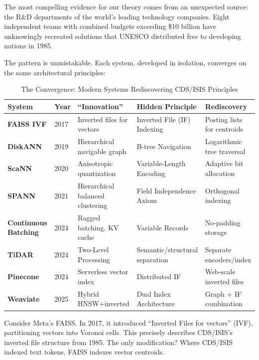\documentclass[manuscript,screen,nonacm]{acmart}
\begin{document}
The most compelling evidence for our theory comes from an unexpected source: the R\&D departments of the world's leading technology companies. Eight independent teams with combined budgets exceeding \$10 billion have unknowingly recreated solutions that UNESCO distributed free to developing nations in 1985.

The pattern is unmistakable. Each system, developed in isolation, converges on the same architectural principles:

\begin{table}[h]
\centering
\caption{The Convergence: Modern Systems Rediscovering CDS/ISIS Principles}
\label{tab:convergence}
\begin{tabular}{p{} p{} p{} p{} p{}}
\toprule
\textbf{System} & \textbf{Year} & \textbf{``Innovation''} & \textbf{Hidden Principle} & \textbf{Rediscovery} \\
\midrule
\textbf{FAISS IVF} \cite{johnson2017} & 2017 & Inverted files for vectors & Inverted File (IF) Indexing & Posting lists for centroids \\
\textbf{DiskANN} \cite{subramanya2019} & 2019 & Hierarchical navigable graph & B-tree Navigation & Logarithmic tree traversal \\
\textbf{ScaNN} \cite{guo2020} & 2020 & Anisotropic quantization & Variable-Length Encoding & Adaptive bit allocation \\
\textbf{SPANN} \cite{chen2021} & 2021 & Hierarchical balanced clustering & Field Independence Axiom & Orthogonal indexing \\
\textbf{Continuous Batching} \cite{reboul2025} & 2024 & Ragged batching, KV cache & Variable Records & No-padding storage \\
\textbf{TiDAR} \cite{liu2024} & 2024 & Two-Level Processing & Semantic/structural separation & Separate encoders/index \\
\textbf{Pinecone} \cite{pinecone2024} & 2024 & Serverless vector index & Distributed IF & Web-scale inverted files \\
\textbf{Weaviate} \cite{weaviate2025} & 2025 & Hybrid HNSW+inverted & Dual Index Architecture & Graph + IF combination \\
\bottomrule
\end{tabular}
\end{table}

Consider Meta's FAISS. In 2017, it introduced ``Inverted Files for vectors'' (IVF), partitioning vectors into Voronoi cells. This precisely describes CDS/ISIS's inverted file structure from 1985. The only modification? Where CDS/ISIS indexed text tokens, FAISS indexes vector centroids.
\end{document}
